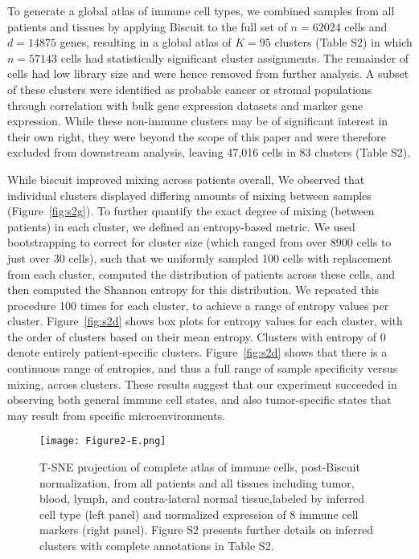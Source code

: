 To generate a global atlas of immune cell types, we combined samples from all patients and tissues by applying Biscuit to the full set of $n=62024$ cells and $d=14875$ genes, resulting in a global atlas of $K=95$ clusters (Table S2) in which $n=57143$ cells had statistically significant cluster assignments.  %
The remainder of cells had low library size and were hence removed from further analysis. %
A subset of these clusters were identified as probable cancer or stromal populations through correlation with bulk gene expression datasets and marker gene expression. 
While these non-immune clusters may be of significant interest in their own right, they were beyond the scope of this paper and were therefore excluded from downstream analysis, leaving 47,016 cells in 83 clusters (Table S2). %

While biscuit improved mixing across patients overall, We observed that individual clusters displayed differing amounts of mixing between samples (Figure~\ref{fig:s2g}).
To further quantify the exact degree of mixing (between patients) in each cluster, we defined an entropy-based metric.
We used bootstrapping to correct for cluster size (which ranged from over 8900 cells to just over 30 cells), such that we uniformly sampled 100 cells with replacement from each cluster, computed the distribution of patients across these cells, and then computed the Shannon entropy for this distribution.
We repeated this procedure 100 times for each cluster, to achieve a range of entropy values per cluster.
Figure~\ref{fig:s2d} shows box plots for entropy values for each cluster, with the order of clusters based on their mean entropy.
Clusters with entropy of 0 denote entirely patient-specific clusters.
Figure~\ref{fig:s2d} shows that there is a continuous range of entropies, and thus a full range of sample specificity versus mixing, across clusters.
These results suggest that our experiment succeeded in observing both general immune cell states, and also tumor-specific states that may result from specific microenvironments. 

\begin{figure}
\centering
\texttt{[image: Figure2-E.png]}
\caption{T-SNE projection of complete atlas of immune cells, post-Biscuit normalization, from all patients and all tissues including tumor, blood, lymph, and contra-lateral normal tissue,labeled by inferred cell type (left panel) and normalized expression of 8 immune cell markers (right panel). Figure S2 presents further details on inferred clusters with complete annotations in Table S2.
} %
\label{fig:2e}
\end{figure}

